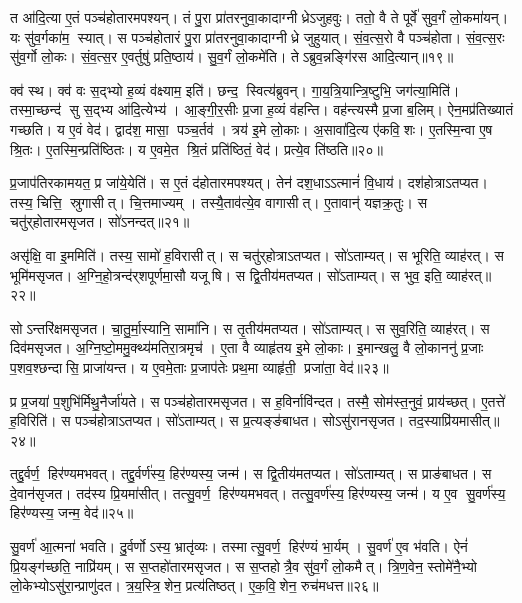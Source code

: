 त आ॑दि॒त्या ए॒तं पञ्च॑होतारमपश्यन्।
तं पु॒रा प्रा॑तरनुवा॒कादाग्नीध्रेऽजुहवुः।
ततो॒ वै ते पूर्वे॑ सुव॒र्गं लो॒कमा॑यन्।
यः सु॑व॒र्गका॑म॒ स्यात्।
स पञ्च॑होतारं पु॒रा प्रा॑तरनुवा॒कादाग्नीध्रे जुहुयात्।
सं॒व॒त्स॒रो वै पञ्च॑होता।
सं॒व॒त्स॒रः सु॑व॒र्गो लो॒कः।
सं॒व॒त्स॒र ए॒वर्तुषु॑ प्रति॒ष्ठाय॑।
सु॒व॒र्गं लो॒कमे॑ति।
तेऽब्रुव॒न्नङ्गि॑रस आदि॒त्यान्॥१९॥

क्व॑ स्थ।
क्व॑ वः स॒द्भ्यो ह॒व्यं व॑क्ष्याम॒ इति॑।
छन्द॒ स्वित्य॑ब्रुवन्।
गा॒य॒त्रि॒यान्त्रि॒ष्टुभि॒ जग॑त्या॒मिति॑।
तस्मा॒च्छन्द॑ सु स॒द्भ्य आ॑दि॒त्येभ्य॑।
आ॒ङ्गी॒र॒सीः प्र॒जा ह॒व्यं व॑हन्ति।
वह॑न्त्यस्मै प्र॒जा ब॒लिम्।
ऐन॒मप्र॑तिख्यातं गच्छति।
य ए॒वं वेद॑।
द्वाद॑श॒ मासा॒ पञ्च॒र्तव॑।
त्रय॑ इ॒मे लो॒काः।
अ॒सावा॑दि॒त्य ए॑कवि॒शः।
ए॒तस्मि॒न्वा ए॒ष श्रि॒तः।
ए॒तस्मि॒न्प्रति॑ष्ठितः।
य ए॒वमे॒त श्रि॒तं प्रति॑ष्ठितं॒ वेद॑।
प्रत्ये॒व ति॑ष्ठति॥२०॥\anuvakamend[स्या॒दिति॑ संवत्स॒रो ज॑नयध्व॒मितीत्य॑ब्रवी॒त्पूर्व॒ इत्या॑दि॒त्यानृ॒तव॒ष्षट्च॑]

प्र॒जाप॑तिरकामयत॒ प्र जा॑ये॒येति॑।
स ए॒तं द॑होतारमपश्यत्।
तेन॑ दश॒धाऽऽत्मानं॑ वि॒धाय॑।
दश॑होत्राऽतप्यत।
तस्य॒ चित्ति॒ स्रुगासीत्।
चि॒त्तमाज्यम्।
तस्यै॒ताव॑त्ये॒व वागासीत्।
ए॒तावान्॑ यज्ञक्र॒तुः।
स चतु॑र्‌होतारमसृजत।
सो॑ऽनन्दत्॥२१॥

असृ॑क्षि॒ वा इ॒ममिति॑।
तस्य॒ सामो॑ ह॒विरासीत्।
स चतु॑र्‌होत्राऽतप्यत।
सो॑ऽताम्यत्।
स भूरिति॒ व्याह॑रत्।
स भूमि॑मसृजत।
अ॒ग्नि॒हो॒त्रन्द॑र्‌शपूर्णमा॒सौ यजूषि।
स द्वि॒तीय॑मतप्यत।
सो॑ऽताम्यत्।
स भुव॒ इति॒ व्याह॑रत्॥२२॥

सोऽन्तरि॑क्षमसृजत।
चा॒तु॒र्मा॒स्यानि॒ सामा॑नि।
स तृ॒तीय॑मतप्यत।
सो॑ऽताम्यत्।
स सुव॒रिति॒ व्याह॑रत्।
स दिव॑मसृजत।
अ॒ग्नि॒ष्टो॒ममु॒क्थ्य॑मतिरा॒त्रमृच॑।
ए॒ता वै व्याहृ॑तय इ॒मे लो॒काः।
इ॒मान्खलु॒ वै लो॒काननु॑ प्र॒जाः प॒शव॒श्छन्दासि॒ प्राजा॑यन्त।
य ए॒वमे॒ताः प्र॒जाप॑तेः प्रथ॒मा व्याहृ॑ती॒ प्रजा॑ता॒ वेद॑॥२३॥

प्र प्र॒जया॑ प॒शुभि॑र्मिथु॒नैर्जा॑यते।
स पञ्च॑होतारमसृजत।
स ह॒विर्नावि॑न्दत।
तस्मै॒ सोम॑स्त॒नुवं॒ प्राय॑च्छत्।
ए॒तत्ते॑ ह॒विरिति॑।
स पञ्च॑होत्राऽतप्यत।
सो॑ऽताम्यत्।
स प्र॒त्यङ्ङ॑बाधत।
सोऽसु॑रानसृजत।
तद॒स्याप्रि॑यमासीत्॥२४॥

तद्दु॒र्वर्ण॒ हिर॑ण्यमभवत्।
तद्दु॒र्वर्ण॑स्य॒ हिर॑ण्यस्य॒ जन्म॑।
स द्वि॒तीय॑मतप्यत।
सो॑ऽताम्यत्।
स प्राङ॑बाधत।
स दे॒वान॑सृजत।
तद॑स्य प्रि॒यमा॑सीत्।
तत्सु॒वर्ण॒ हिर॑ण्यमभवत्।
तत्सु॒वर्ण॑स्य॒ हिर॑ण्यस्य॒ जन्म॑।
य ए॒व सु॒वर्ण॑स्य॒ हिर॑ण्यस्य॒ जन्म॒ वेद॑॥२५॥

सु॒वर्ण॑ आ॒त्मना॑ भवति।
दु॒र्वर्णोऽस्य॒ भ्रातृ॑व्यः।
तस्मात्सु॒वर्ण॒ हिर॑ण्यं भा॒र्यम्।
सु॒वर्ण॑ ए॒व भ॑वति।
ऐनं॑ प्रि॒यङ्ग॑च्छति॒ नाप्रि॑यम्।
स स॒प्तहो॑तारमसृजत।
स स॒प्तहोत्रै॒व सु॑व॒र्गं लो॒कमैत्।
त्रि॒ण॒वेन॒ स्तोमे॑नै॒भ्यो लो॒केभ्योऽसु॑रा॒न्प्राणु॑दत।
त्र॒य॒स्त्रि॒शेन॒ प्रत्य॑तिष्ठत्।
ए॒क॒वि॒शेन॒ रुच॑मधत्त॥२६॥

